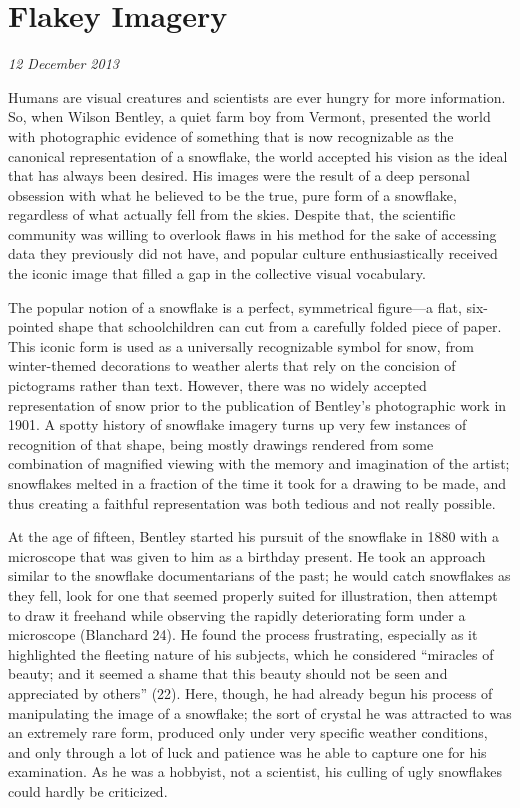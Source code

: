 \section{Flakey Imagery}

\textit{12 December 2013}


Humans are visual creatures and scientists are ever hungry for more information.
So, when Wilson Bentley, a quiet farm boy from Vermont, presented the world with
photographic evidence of something that is now recognizable as the canonical
representation of a snowflake, the world accepted his vision as the ideal that
has always been desired. His images were the result of a deep personal obsession
with what he believed to be the true, pure form of a snowflake, regardless of
what actually fell from the skies. Despite that, the scientific community was
willing to overlook flaws in his method for the sake of accessing data they
previously did not have, and popular culture enthusiastically received the
iconic image that filled a gap in the collective visual vocabulary.

The popular notion of a snowflake is a perfect, symmetrical figure---a flat,
six-pointed shape that schoolchildren can cut from a carefully folded piece of
paper. This iconic form is used as a universally recognizable symbol for snow,
from winter-themed decorations to weather alerts that rely on the concision of
pictograms rather than text. However, there was no widely accepted
representation of snow prior to the publication of Bentley's photographic work
in 1901. A spotty history of snowflake imagery turns up very few instances of
recognition of that shape, being mostly drawings rendered from some combination
of magnified viewing with the memory and imagination of the artist; snowflakes
melted in a fraction of the time it took for a drawing to be made, and thus
creating a faithful representation was both tedious and not really possible. 

At the age of fifteen, Bentley started his pursuit of the snowflake in 1880 with
a microscope that was given to him as a birthday present. He took an approach
similar to the snowflake documentarians of the past; he would catch snowflakes
as they fell, look for one that seemed properly suited for illustration, then
attempt to draw it freehand while observing the rapidly deteriorating form under
a microscope (Blanchard 24). He found the process frustrating, especially as it
highlighted the fleeting nature of his subjects, which he considered ``miracles
of beauty; and it seemed a shame that this beauty should not be seen and
appreciated by others'' (22). Here, though, he had already begun his process of
manipulating the image of a snowflake; the sort of crystal he was attracted to
was an extremely rare form, produced only under very specific weather
conditions, and only through a lot of luck and patience was he able to capture
one for his examination. As he was a hobbyist, not a scientist, his culling of
ugly snowflakes could hardly be criticized. 


